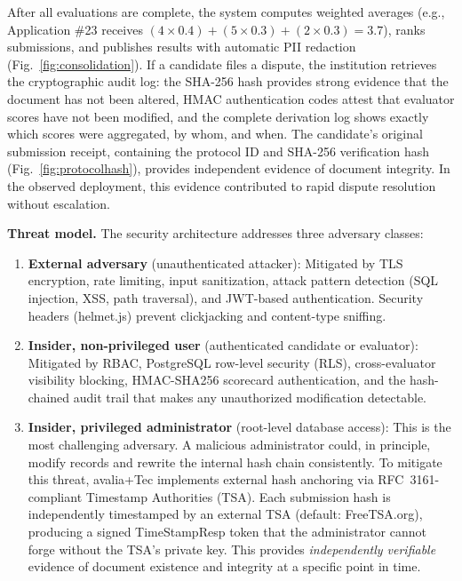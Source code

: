\documentclass[preprint,12pt,a4paper]{elsarticle}
\begin{document}
After all evaluations are complete, the system computes weighted averages (e.g., Application \#23 receives $(4 \times 0.4) + (5 \times 0.3) + (2 \times 0.3) = 3.7$), ranks submissions, and publishes results with automatic PII redaction (Fig.~\ref{fig:consolidation}). If a candidate files a dispute, the institution retrieves the cryptographic audit log: the SHA-256 hash provides strong evidence that the document has not been altered, HMAC authentication codes attest that evaluator scores have not been modified, and the complete derivation log shows exactly which scores were aggregated, by whom, and when. The candidate's original submission receipt, containing the protocol ID and SHA-256 verification hash (Fig.~\ref{fig:protocolhash}), provides independent evidence of document integrity. In the observed deployment, this evidence contributed to rapid dispute resolution without escalation.

\textbf{Threat model.} The security architecture addresses three adversary classes:

\begin{enumerate}
  \item \textbf{External adversary} (unauthenticated attacker): Mitigated by TLS encryption, rate limiting, input sanitization, attack pattern detection (SQL injection, XSS, path traversal), and JWT-based authentication. Security headers (helmet.js) prevent clickjacking and content-type sniffing.
  \item \textbf{Insider, non-privileged user} (authenticated candidate or evaluator): Mitigated by RBAC, PostgreSQL row-level security (RLS), cross-evaluator visibility blocking, HMAC-SHA256 scorecard authentication, and the hash-chained audit trail that makes any unauthorized modification detectable.
  \item \textbf{Insider, privileged administrator} (root-level database access): This is the most challenging adversary. A malicious administrator could, in principle, modify records and rewrite the internal hash chain consistently. To mitigate this threat, avalia+Tec implements external hash anchoring via RFC~3161-compliant Timestamp Authorities (TSA). Each submission hash is independently timestamped by an external TSA (default: FreeTSA.org), producing a signed TimeStampResp token that the administrator cannot forge without the TSA's private key. This provides \emph{independently verifiable} evidence of document existence and integrity at a specific point in time.
\end{enumerate}
\end{document}
